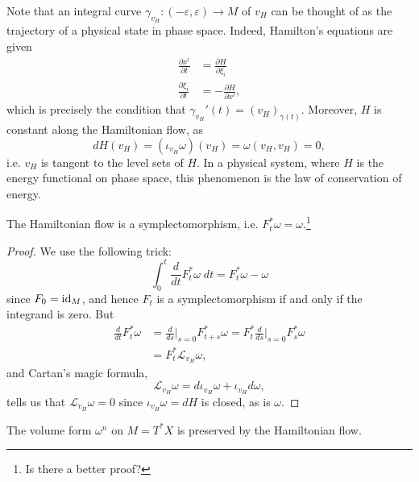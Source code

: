 \documentclass{amsart}
\begin{document}
Note that an integral curve $\gamma_{v_H}:(-\varepsilon,\varepsilon)\to M$ of $v_H$ can be thought
of as the trajectory of a physical state in phase space. Indeed, Hamilton's equations are given
\begin{align*}
    \frac{\partial x^i}{\partial t} &= \frac{\partial H}{\partial \xi_i} \\
    \frac{\partial \xi_i}{\partial t} &= - \frac{\partial H}{\partial x^i},
\end{align*}
which is precisely the condition that $\gamma_{v_H}'(t)=(v_H)_{\gamma(t)}$. Moreover, $H$ is
constant along the Hamiltonian flow, as
\begin{equation*}
    dH(v_H) = (\iota_{v_H}\omega)(v_H)=\omega(v_H,v_H) = 0,
\end{equation*}
i.e. $v_H$ is tangent to the level sets of $H$. In a physical system, where $H$ is the
energy functional on phase space, this phenomenon is the law of conservation of energy.

\begin{proposition}
    The Hamiltonian flow is a symplectomorphism, i.e. $F_t^*\omega=\omega$.\footnote{Is there
    a better proof?}
\end{proposition}
\begin{proof}
    We use the following trick:
    \begin{equation*}
        \int_0^t \frac{d}{dt}F_t^*\omega\; dt = F_t^*\omega-\omega
    \end{equation*}
    since $F_0=\operatorname{id}_M$, and hence $F_t$ is a symplectomorphism if and only if the integrand
    is zero. But
    \begin{align*}
        \frac{d}{dt}F_t^*\omega &= \frac{d}{ds}\bigg|_{s=0}F_{t+s}^*\omega=F_t^*\frac{d}{ds}\bigg|_{s=0}F_s^*\omega \\
        &= F_t^*\mathcal{L}_{v_H}\omega,
    \end{align*}
    and Cartan's magic formula,
    \begin{equation*}
        \mathcal{L}_{v_H}\omega = d\iota_{v_H}\omega + \iota_{v_H}d\omega,
    \end{equation*}
    tells us that $\mathcal{L}_{v_H}\omega=0$ since $\iota_{v_H}\omega=dH$ is closed, as is $\omega$.
\end{proof}

\begin{corollary}
    The volume form $\omega^n$ on $M=T^*X$ is preserved by the Hamiltonian flow.
\end{corollary}
\end{document}
